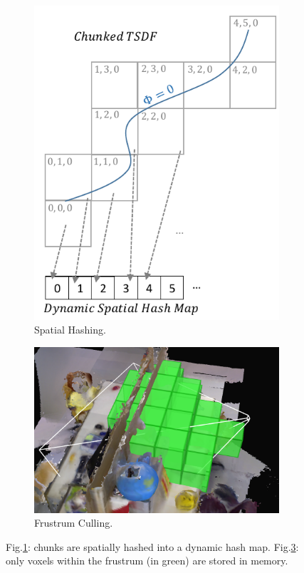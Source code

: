 \documentclass[conference]{IEEEtran}
\newcommand{\figref}[1]{Fig.\ref{#1}}
\begin{document}
\begin{figure}[t!]
 	  	\begin{subfigure}[b]{0.45\linewidth} \centering
 	    \includegraphics[width=1.0\textwidth]{img/chunks.pdf}
 	      \caption{Spatial Hashing.}
 	  	\label{fig:chunks} 
 	  \end{subfigure} 
 	  \begin{subfigure}[b]{0.55\linewidth} \centering
 	  	  \hspace{-5em}
	      \includegraphics[width=1.0\textwidth]{img/frustum_cull}
	      \caption{Frustrum Culling.}
	 	 \label{fig:frustum_cull}
	  \end{subfigure}
	  \caption{\figref{fig:chunks}: chunks are spatially hashed \cite{SpatialHashing} into a
      dynamic hash map. 
      \figref{fig:frustum_cull}: only voxels within the frustrum (in green) are stored in memory.}
\end{figure} 
\end{document}
